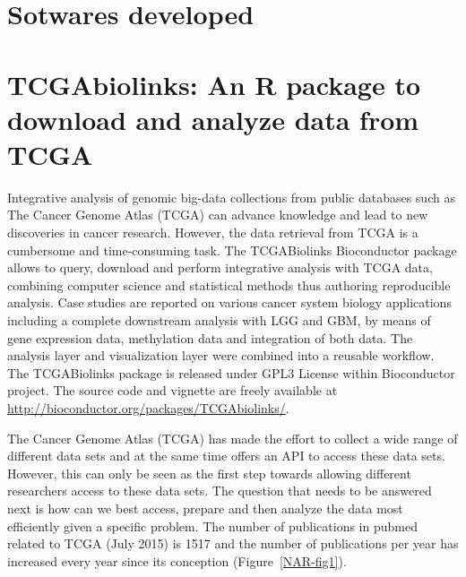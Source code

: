 
\section{Sotwares developed}

\section{TCGAbiolinks: An R package to download and analyze data from TCGA}


 Integrative analysis of genomic big-data collections from public databases such as The Cancer Genome Atlas (TCGA) can advance knowledge and lead to new discoveries in cancer research.  However, the data retrieval from TCGA is a cumbersome and time-consuming task. The TCGABiolinks Bioconductor package allows to query, download and perform integrative analysis with TCGA data, combining computer science and statistical methods thus authoring reproducible analysis. 
  Case studies are reported on various cancer system biology applications including a complete downstream analysis with LGG and GBM, by means of gene expression data,  methylation data and integration of both data.
  The analysis layer and visualization layer were combined into a reusable workflow. 
  The TCGABiolinks package is released under GPL3 License within Bioconductor project. The source code and vignette are freely available at \url{http://bioconductor.org/packages/TCGAbiolinks/}.
  
  The Cancer Genome Atlas (TCGA) has made the effort to collect a wide range of different data sets and at the same time offers an API to access these data sets. However, this can only be seen as the first step towards allowing different researchers access to these data sets. The question that needs to be answered next is how can we best access, prepare and then analyze the data most efficiently given a specific problem. 
The number of publications in pubmed related to TCGA (July 2015) is 1517 and the number of publications per year has increased every year since its conception (Figure~\ref{NAR-fig1}).

